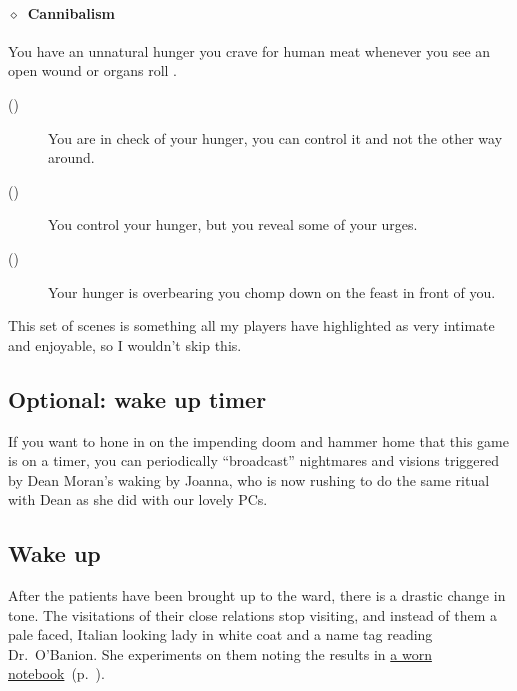 \documentclass[bg-full]{resources/stylesheets/kult}
\begin{document}

\paragraph{\(\diamond\)~Cannibalism}\label{disadv:cannibalism}%
You have an unnatural hunger you crave for human meat whenever you see an open wound or organs roll .
\begin{description}
  \item[()] You are in check of your hunger, you can control it and not the other way around.
  \item[()] You control your hunger, but you reveal some of your urges.
  \item[()] Your hunger is overbearing you chomp down on the feast in front of you.
\end{description}
\KULTrule%

This set of scenes is something all my players have highlighted as very intimate and enjoyable, so I wouldn't skip this.

\subsection*{Optional: wake up timer}
If you want to hone in on the impending doom and hammer home that this game is on a timer, you can periodically “broadcast”
nightmares and visions triggered by Dean Moran's waking by Joanna, who is now rushing to do the same ritual
with Dean as she did with our lovely PCs.

\subsection{Wake up}%
\label{sub:wake_up}

After the patients have been brought up to the ward, there is a drastic change in tone.  The visitations of their close relations
stop visiting, and instead of them a pale faced, Italian looking lady in white coat and a name tag reading Dr.~O'Banion.  She
experiments on them noting the results in \hyperref[notebook]{a worn notebook}~(p.~\pageref{notebook}).
\end{document}
